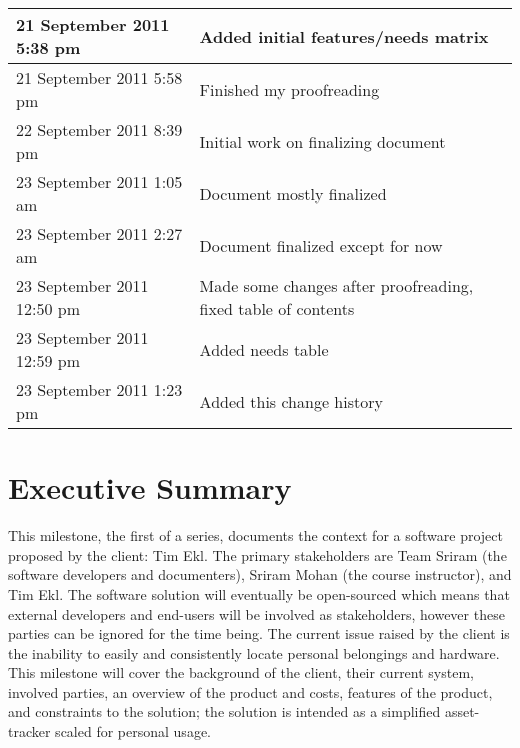 \documentclass{article}
\begin{document}
\begin{tabular}{ | p{2in} | p{4.5in} | }
\hline
21 September 2011  5:38 pm & Added initial features/needs matrix \\
\hline
21 September 2011  5:58 pm & Finished my proofreading \\
\hline
22 September 2011  8:39 pm & Initial work on finalizing document \\
\hline
23 September 2011  1:05 am & Document mostly finalized \\
\hline
23 September 2011  2:27 am & Document finalized except for now \\
\hline
23 September 2011  12:50 pm & Made some changes after proofreading, fixed table of contents \\
\hline
23 September 2011  12:59 pm & Added needs table \\
\hline
23 September 2011  1:23 pm & Added this change history \\
\hline
\end{tabular}
\clearpage
\section{Executive Summary}
This milestone, the first of a series, documents the context for a software project proposed by the client: Tim Ekl. The primary stakeholders are Team Sriram (the software developers and documenters), Sriram Mohan (the course instructor), and Tim Ekl.  The software solution will eventually be open-sourced which means that external developers and end-users will be involved as stakeholders, however these parties can be ignored for the time being. The current issue raised by the client is the inability to easily and consistently locate personal belongings and hardware. This milestone will cover the background of the client, their current system, involved parties, an overview of the product and costs, features of the product, and constraints to the solution; the solution is intended as a simplified asset-tracker scaled for personal usage.
\end{document}
